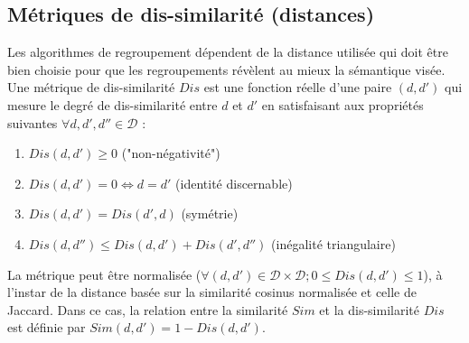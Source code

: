 

\subsection{Métriques de dis-similarité (distances)}
\label{sec:similarite:distances}
Les algorithmes de regroupement dépendent de la distance utilisée qui doit être bien choisie pour que les regroupements révèlent au mieux la sémantique visée.
 Une métrique de dis-similarité $Dis$ est une fonction réelle d'une paire $(d,d')$ qui mesure le degré de dis-similarité entre $d$ et $d'$  en satisfaisant aux propriétés suivantes $\forall d,d',d'' \in \mathcal{D}$ \citep{wang2015distancemetriclearningsurvey}:
\begin{enumerate}
\item $Dis(d,d') \geq 0$ ("non-négativité")
\item $Dis(d,d') = 0  \Leftrightarrow d = d'$ (identité discernable)
\item $Dis(d,d') = Dis(d', d)$ (symétrie)
\item $Dis(d,d'') \leq Dis(d,d') + Dis(d',d'')$ (inégalité triangulaire) \label{enum:sim:ineq-tri}
\end{enumerate}


La métrique peut être normalisée ($\forall (d,d') \in \mathcal{D} \times \mathcal{D};  0 \leq Dis(d,d') \leq 1$), à l'instar de la distance basée sur la similarité cosinus normalisée et celle de Jaccard. Dans ce cas, la relation entre la similarité $Sim$ et la dis-similarité $Dis$ est définie par $Sim(d,d') = 1 - Dis(d,d')$.

